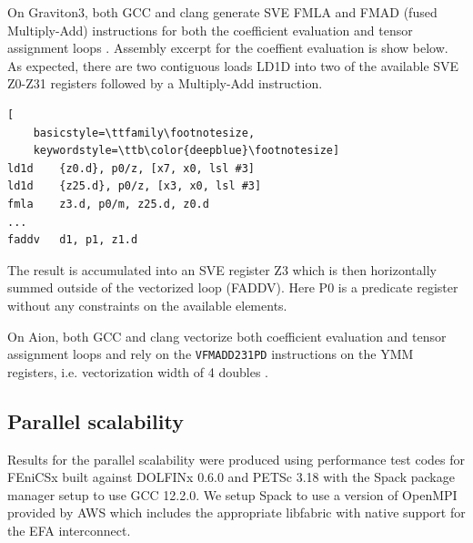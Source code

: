 On Graviton3, both GCC and clang generate SVE FMLA and FMAD (fused
Multiply-Add) instructions \citep{ArmReferenceManual} for both the
coefficient evaluation and tensor assignment loops
\citep{GodboltArmClang,GodboltArmGCC}. Assembly excerpt for the coeffient
evaluation is show below. As expected, there are two contiguous loads LD1D
into two of the available SVE Z0-Z31 registers followed by a Multiply-Add
instruction.

\begin{lstlisting}[
    basicstyle=\ttfamily\footnotesize,
    keywordstyle=\ttb\color{deepblue}\footnotesize]
ld1d    {z0.d}, p0/z, [x7, x0, lsl #3]
ld1d    {z25.d}, p0/z, [x3, x0, lsl #3]
fmla    z3.d, p0/m, z25.d, z0.d
...
faddv   d1, p1, z1.d
\end{lstlisting}
The result is accumulated into an SVE register Z3 which is then horizontally
summed outside of the vectorized loop (FADDV). Here P0 is a predicate
register without any constraints on the available elements.

On Aion, both GCC and clang vectorize both coefficient evaluation and tensor
assignment loops and rely on the \lstinline{VFMADD231PD} instructions on the
YMM registers, i.e. vectorization width of 4 doubles
\citep{Godboltx86Clang,Godboltx86GCC}.


\subsection*{Parallel scalability}

Results for the parallel scalability were produced using performance test codes
for FEniCSx \citep{Wells2023} built against DOLFINx 0.6.0 and PETSc 3.18
\citep{petsc} with the Spack package manager setup to use GCC 12.2.0. We setup
Spack to use a version of OpenMPI provided by AWS which includes the
appropriate libfabric with native support for the EFA interconnect.

